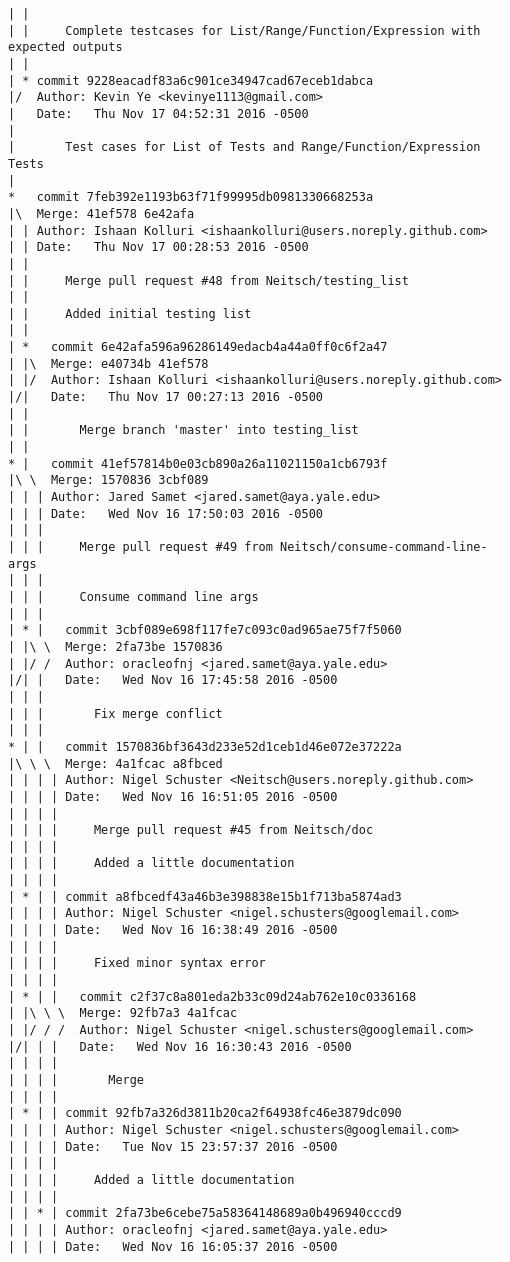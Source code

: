 \begin{lstlisting}
| | 
| |     Complete testcases for List/Range/Function/Expression with expected outputs
| |   
| * commit 9228eacadf83a6c901ce34947cad67eceb1dabca
|/  Author: Kevin Ye <kevinye1113@gmail.com>
|   Date:   Thu Nov 17 04:52:31 2016 -0500
|   
|       Test cases for List of Tests and Range/Function/Expression Tests
|    
*   commit 7feb392e1193b63f71f99995db0981330668253a
|\  Merge: 41ef578 6e42afa
| | Author: Ishaan Kolluri <ishaankolluri@users.noreply.github.com>
| | Date:   Thu Nov 17 00:28:53 2016 -0500
| | 
| |     Merge pull request #48 from Neitsch/testing_list
| |     
| |     Added initial testing list
| |     
| *   commit 6e42afa596a96286149edacb4a44a0ff0c6f2a47
| |\  Merge: e40734b 41ef578
| |/  Author: Ishaan Kolluri <ishaankolluri@users.noreply.github.com>
|/|   Date:   Thu Nov 17 00:27:13 2016 -0500
| |   
| |       Merge branch 'master' into testing_list
| |     
* |   commit 41ef57814b0e03cb890a26a11021150a1cb6793f
|\ \  Merge: 1570836 3cbf089
| | | Author: Jared Samet <jared.samet@aya.yale.edu>
| | | Date:   Wed Nov 16 17:50:03 2016 -0500
| | | 
| | |     Merge pull request #49 from Neitsch/consume-command-line-args
| | |     
| | |     Consume command line args
| | |      
| * |   commit 3cbf089e698f117fe7c093c0ad965ae75f7f5060
| |\ \  Merge: 2fa73be 1570836
| |/ /  Author: oracleofnj <jared.samet@aya.yale.edu>
|/| |   Date:   Wed Nov 16 17:45:58 2016 -0500
| | |   
| | |       Fix merge conflict
| | |      
* | |   commit 1570836bf3643d233e52d1ceb1d46e072e37222a
|\ \ \  Merge: 4a1fcac a8fbced
| | | | Author: Nigel Schuster <Neitsch@users.noreply.github.com>
| | | | Date:   Wed Nov 16 16:51:05 2016 -0500
| | | | 
| | | |     Merge pull request #45 from Neitsch/doc
| | | |     
| | | |     Added a little documentation
| | | |     
| * | | commit a8fbcedf43a46b3e398838e15b1f713ba5874ad3
| | | | Author: Nigel Schuster <nigel.schusters@googlemail.com>
| | | | Date:   Wed Nov 16 16:38:49 2016 -0500
| | | | 
| | | |     Fixed minor syntax error
| | | |       
| * | |   commit c2f37c8a801eda2b33c09d24ab762e10c0336168
| |\ \ \  Merge: 92fb7a3 4a1fcac
| |/ / /  Author: Nigel Schuster <nigel.schusters@googlemail.com>
|/| | |   Date:   Wed Nov 16 16:30:43 2016 -0500
| | | |   
| | | |       Merge
| | | |     
| * | | commit 92fb7a326d3811b20ca2f64938fc46e3879dc090
| | | | Author: Nigel Schuster <nigel.schusters@googlemail.com>
| | | | Date:   Tue Nov 15 23:57:37 2016 -0500
| | | | 
| | | |     Added a little documentation
| | | |     
| | * | commit 2fa73be6cebe75a58364148689a0b496940cccd9
| | | | Author: oracleofnj <jared.samet@aya.yale.edu>
| | | | Date:   Wed Nov 16 16:05:37 2016 -0500

\end{lstlisting}
